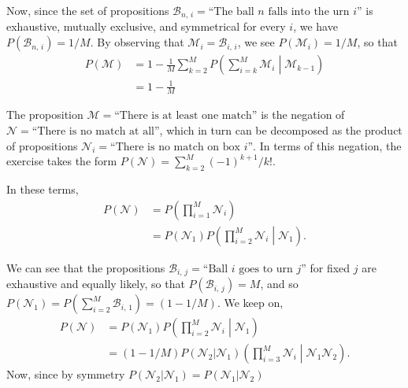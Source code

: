 \documentclass{article}
\begin{document}
Now, since the set of propositions $\mathcal B_{n,\,i}=\text{``The ball $n$ falls into the urn $i$''}$ is exhaustive, mutually exclusive, and symmetrical for every $i$, we have $P(\mathcal B_{n,\,i})=1/M$. By observing that $\mathcal M_i=\mathcal B_{i,\,i}$, we see $P(\mathcal M_i)=1/M$, so that
\begin{align}
	P(\mathcal M)&=1-\frac1M\sum_{k=2}^MP\left(\sum_{i=k}^M\mathcal M_i\middle|\mathcal M_{k-1}\right)\\
	&=1-\frac1M
\end{align}

The proposition $\mathcal M=\text{``There is at least one match''}$ is the negation of $\mathcal N=\text{``There is no match at all''}$, which in turn can be decomposed as the product of propositions $\mathcal N_i=\text{``There is no match on box $i$''}$. In terms of this negation, the exercise takes the form $P(\mathcal N)=\sum_{k=2}^M(-1)^{k+1}/k!$.

In these terms,
\begin{align}
	P(\mathcal N)&=P\left(\prod_{i=1}^M\mathcal N_i\right)\\
	&=P(\mathcal N_1)P\left(\prod_{i=2}^M\mathcal N_i\middle|\mathcal N_1\right).
\end{align}

We can see that the propositions $\mathcal B_{i,\,j}=\text{``Ball $i$ goes to urn $j$''}$ for fixed $j$ are exhaustive and equally likely, so that $P(\mathcal B_{i,\,j})=M$, and so $P(\mathcal N_1)=P\left(\sum_{i=2}^M\mathcal B_{i,\,1}\right)=(1-1/M)$. We keep on,
\begin{align}
	P(\mathcal N)&=P(\mathcal N_1)P\left(\prod_{i=2}^M\mathcal N_i\middle|\mathcal N_1\right)\\
	&=(1-1/M)P(\mathcal N_2|\mathcal N_1)\left(\prod_{i=3}^M\mathcal N_i\middle|\mathcal N_1\mathcal N_2\right).
\end{align}
Now, since by symmetry $P(\mathcal N_2|\mathcal N_1)=P(\mathcal N_1|\mathcal N_2)$
\end{document}
